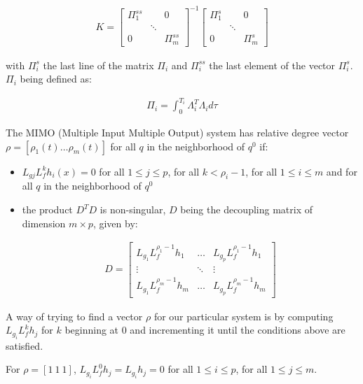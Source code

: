 \documentclass[letterpaper, 10 pt, conference]{ieeeconf}  %
\begin{document}
\begin{eqnarray}
K = 
\left[\begin{array}{ccc}
\Pi^{ss}_1 & & 0\\
& \ddots &\\
0 & & \Pi^{ss}_m
\end{array}\right]^{-1}
\left[\begin{array}{ccc}
\Pi^{s}_1 & & 0\\
& \ddots &\\
0 & & \Pi^{s}_m
\end{array}\right]
\end{eqnarray}

with $\Pi^{s}_i$ the last line of the matrix $\Pi_i$ and $\Pi^{ss}_i$ the last element of the vector $\Pi^{s}_i$. $\Pi_i$ being defined as:

\begin{eqnarray}
\Pi_i = \int^{T_i}_0\Lambda_i^T\Lambda_id\tau
\end{eqnarray}

The MIMO (Multiple Input Multiple Output) system has relative degree vector $\rho = [\rho_1(t) \dots \rho_m(t)]$ for all $q$ in the neighborhood of $q^0$ if:

\begin{itemize}
\item $L_{gj}L_f^kh_i(x) = 0$ for all $1 \leq j \leq p$, for all $k < \rho_i-1$, for all $1 \leq i \leq m$ and for all $q$ in the neighborhood of $q^0$
\item the product $D^TD$ is non-singular, $D$ being the decoupling matrix of dimension $m \times p$, given by:

\begin{eqnarray}
D = 
\left[\begin{array}{ccc}
L_{g_1}L_f^{\rho_1-1}h_1 & \dots & L_{g_p}L_f^{\rho_1-1}h_1\\
\vdots & \ddots & \vdots\\
L_{g_1}L_f^{\rho_m-1}h_m & \dots & L_{g_p}L_f^{\rho_m-1}h_m
\end{array}\right]
\end{eqnarray}
\end{itemize}

A way of trying to find a vector $\rho$ for our particular system is by computing $L_{g_i}L_f^kh_j$ for $k$ beginning at $0$ and incrementing it until the conditions above are satisfied.

For $\rho = [1\ 1\ 1]$, $L_{g_i}L_f^0h_j = L_{g_i}h_j = 0$ for all $1 \leq i \leq p$, for all $1 \leq j \leq m$.
\end{document}
